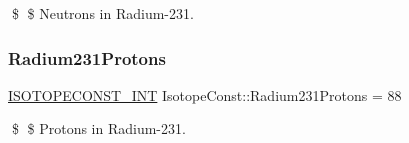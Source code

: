 \$ \$ Neutrons in Radium-\/231. \mbox{\label{group___isotope_const-_radium-_ra231_ga165d958ca07169ff2d864dfb4d06d26e}} 
\subsubsection{\texorpdfstring{Radium231\+Protons}{Radium231Protons}}
{\footnotesize\ttfamily \mbox{\hyperlink{group___isotope_const-_macros_ga5f18360b3e99483a35c32d789e62621c}{I\+S\+O\+T\+O\+P\+E\+C\+O\+N\+S\+T\+\_\+\+I\+NT}} Isotope\+Const\+::\+Radium231\+Protons = 88}

\$ \$ Protons in Radium-\/231. 